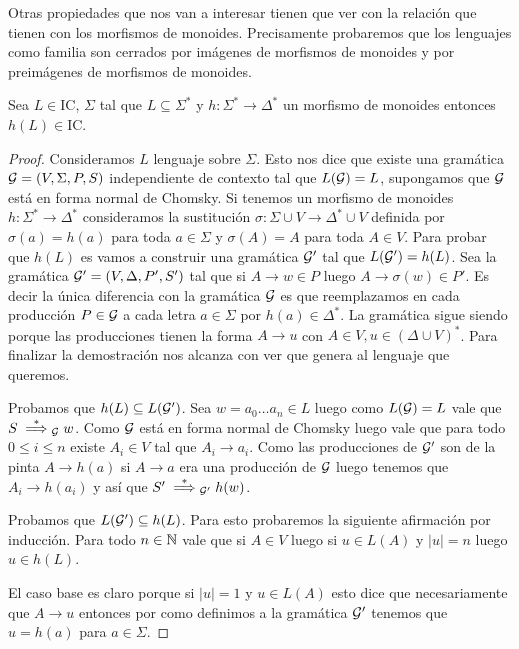 \documentclass[tesis.tex]{subfiles}
\begin{document}
Otras propiedades que nos van a interesar tienen que ver con la relación que tienen con los morfismos de monoides.
Precisamente probaremos que los lenguajes \ic como familia son cerrados por imágenes de morfismos de monoides y por preimágenes de morfismos de monoides.
 

\begin{prop}\label{morfismos-monoides-ic}

		Sea $L \in \text{IC}$, $\Sigma$ tal que $L \subseteq \Sigma^{*}$ y $h:\Sigma^{*} \to \Delta^*$ un morfismo de monoides 
		 entonces $h(L) \in \text{IC}$.
		 
\end{prop}

\begin{proof}
		Consideramos $L$ lenguaje \ic sobre $\Sigma$.
		Esto nos dice que existe una gramática ${\cal G} = (V, \Sigma, P, S) $ independiente de contexto tal que $L({\cal G}) = L$, supongamos que ${\cal G}$ está en forma normal de Chomsky.
		Si tenemos un morfismo de monoides $h: \Sigma^* \to \Delta^*$ consideramos la sustitución $\sigma:\Sigma \cup V \to \Delta^* \cup V$ definida por $\sigma(a) = h(a)$ para toda $a \in \Sigma$ y $\sigma(A) = A$ para toda $A \in V$.		
		Para probar que $h(L)$ es \ic vamos a construir una gramática ${\cal G}'$ tal que $L({\cal G}') = h(L)$.
		Sea la gramática ${\cal G}'  = (V, \Delta, P', S')$ tal que si $A \to w \in P$ luego $A \to \sigma(w) \in P'$.
		Es decir la única diferencia con la gramática ${\cal G}$ es que reemplazamos en cada producción $P \in {\cal G}$ a cada letra $a \in \Sigma$ por $h(a) \in \Delta^*$.
		La gramática sigue siendo \ic porque las producciones tienen la forma $A \to u$ con $A \in V, u \in (\Delta \cup V)^*$.
		Para finalizar la demostración nos alcanza con ver que genera al lenguaje que queremos.
		
		Probamos que $h(L) \subseteq L({\cal G}')$.
		Sea $w=a_{0}\dots a_{n} \in L$ luego como $L({\cal G}) = L$ vale que 
		$S \overset{*}{\implies}_{{\cal G}} w$. 
		Como ${\cal G}$ está en forma normal de Chomsky luego vale que para todo $0 \le i \le n$ existe $A_{i} \in V$ tal que $A_{i} \to a_{i}$.
		Como las producciones de ${\cal G}'$ son de la pinta $A \to h(a)$ si $A \to a$ era una producción de ${\cal G}$ luego tenemos que $A_{i} \to h(a_{i})$ y así que $S' \overset{*}{\implies}_{{\cal G}'} h(w)$.
		
		Probamos que $L({\cal G}') \subseteq h(L)$.
		Para esto probaremos la siguiente afirmación por inducción.
		Para todo $n \in \mathbb{N}$ vale que si $A \in V$ luego si $u \in L(A)$ y $|u| = n$ luego $u \in h(L)$.
		
		El caso base es claro porque si $|u| = 1$ y $u \in L(A)$ esto dice que necesariamente que $A \to u$ entonces por como definimos a la gramática ${\cal G}'$ tenemos que $u = h(a)$ para $a \in \Sigma$.
		

\end{proof}
\end{document}
